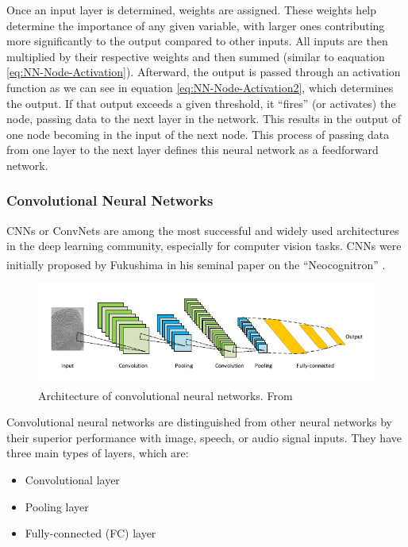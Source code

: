 Once an input layer is determined, weights are assigned. These weights help determine the importance of any given variable, with larger ones contributing more significantly to the output compared to other inputs. All inputs are then multiplied by their respective weights and then summed (similar to eaquation \ref{eq:NN-Node-Activation}). Afterward, the output is passed through an activation function as we can see in equation \ref{eq:NN-Node-Activation2}, which determines the output. If that output exceeds a given threshold, it “fires” (or activates) the node, passing data to the next layer in the network. This results in the output of one node becoming in the input of the next node. This process of passing data from one layer to the next layer defines this neural network as a feedforward network.

\subsubsection{Convolutional Neural Networks}
CNNs or ConvNets are among the most successful and widely used architectures in the deep learning community, especially for computer vision tasks. CNNs were initially proposed by Fukushima in his seminal paper on the “Neocognitron” \textsuperscript{\cite{fukushima_Neocognitron}}.

\begin{figure}[H]
\centering
\includegraphics[width=\linewidth]{../images/CNN.png}
\caption{Architecture of convolutional neural networks. From \textsuperscript{\cite{minaee2021image}}}
\label{fig:CNN}
\end{figure}

Convolutional neural networks are distinguished from other neural networks by their superior performance with image, speech, or audio signal inputs. They have three main types of layers, which are:

\begin{itemize}
    \item Convolutional layer
    \item Pooling layer
    \item Fully-connected (FC) layer
\end{itemize}


